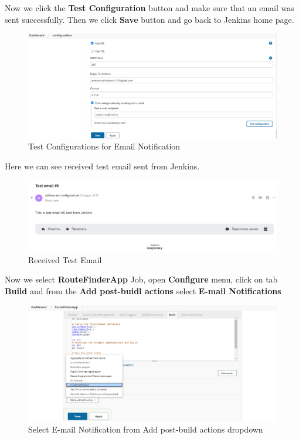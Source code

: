 \documentclass[12pt,a4paper,twoside]{article}
\begin{document}
Now we click the \textbf{Test Configuration} button and make sure that an email was sent successfully. Then we click \textbf{Save} button and go back to Jenkins home page.


\begin{figure}[H]
    \centering
        \includegraphics[width=15cm]{images-aws/53-email-test-configuration.png}
        \caption{Test Configurations for Email Notification}
\end{figure}


Here we can see received test email sent from Jenkins.


\begin{figure}[H]
    \centering
        \includegraphics[width=15cm]{images-aws/54-email-test-confirmation.png}
        \caption{Received Test Email}
\end{figure}


Now we select \textbf{RouteFinderApp} Job, open \textbf{Configure} menu, click on tab \textbf{Build} and from the \textbf{Add post-buidl actions} select \textbf{E-mail Notifications}


\begin{figure}[H]
    \centering
        \includegraphics[width=15cm]{images-aws/55-email-notification-buil-setting.png}
        \caption{Select E-mail Notification from Add post-build actions dropdown}
\end{figure}
\end{document}
